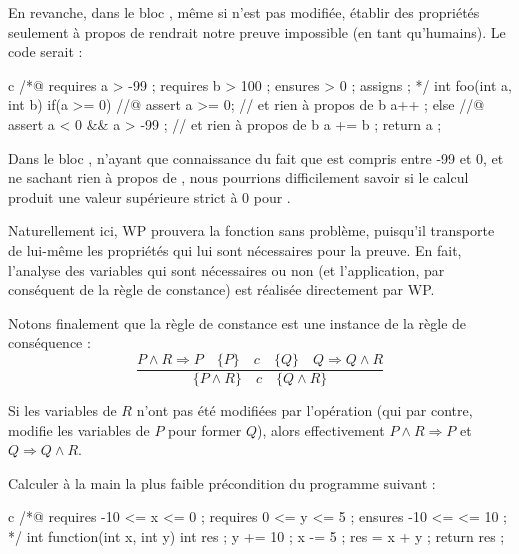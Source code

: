 En revanche, dans le bloc , même si  n'est pas modifiée, établir
des propriétés seulement à propos de  rendrait notre preuve impossible (en
tant qu'humains). Le code serait :



\begin{CodeBlock}{c}
/*@
  requires a > -99 ;
  requires b > 100 ;
  ensures  \result > 0 ;
  assigns  \nothing ;
*/
int foo(int a, int b){
  if(a >= 0){
    //@ assert a >= 0; // et rien à propos de b
    a++ ;
  } else {
    //@ assert a < 0 && a > -99 ; // et rien à propos de b
    a += b ;
  }
  return a ;
}
\end{CodeBlock}



Dans le bloc , n'ayant que connaissance du fait que  est compris
entre -99 et 0, et ne sachant rien à propos de , nous pourrions 
difficilement savoir si le calcul  produit une valeur supérieure
strict à 0 pour .



Naturellement ici, WP prouvera la fonction sans problème, puisqu'il transporte
de lui-même les propriétés qui lui sont nécessaires pour la preuve. En fait,
l'analyse des variables qui sont nécessaires ou non (et l'application, par 
conséquent de la règle de constance) est réalisée directement par WP.



Notons finalement que la règle de constance est une instance de la règle de 
conséquence :
$$\dfrac{P \wedge R \Rightarrow P \quad \{P\}\quad c\quad \{Q\} \quad Q \Rightarrow Q \wedge R}{\{P \wedge R\}\quad c\quad \{Q \wedge R\}}$$



Si les variables de $R$ n'ont pas été modifiées par l'opération (qui par contre, 
modifie les variables de $P$ pour former $Q$), alors effectivement 
$P \wedge R \Rightarrow P$ et $Q \Rightarrow Q \wedge R$.



 



Calculer à la main la plus faible précondition du programme suivant :


\begin{CodeBlock}{c}
/*@
  requires -10 <= x <= 0 ;
  requires 0 <= y <= 5 ;
  ensures -10 <= \result <= 10 ;
*/
int function(int x, int y){
  int res ;
  y += 10 ;
  x -= 5 ;
  res = x + y ;
  return res ;
}
\end{CodeBlock}


